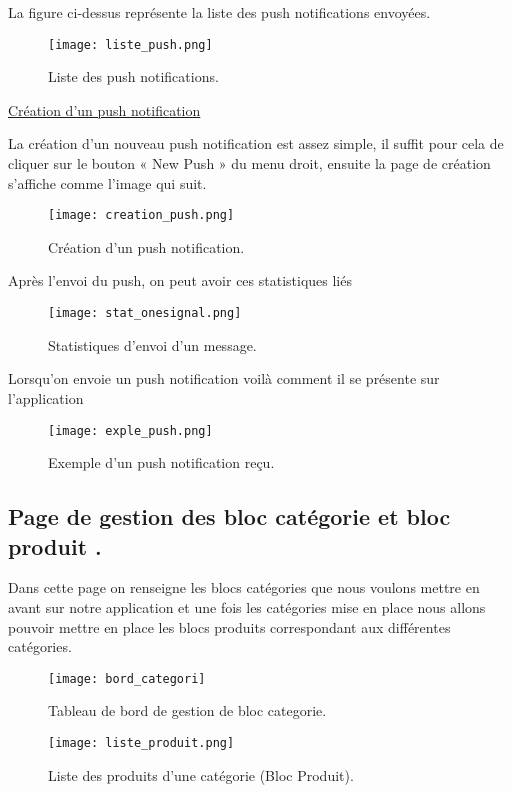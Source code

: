 La figure ci-dessus représente la liste des push notifications envoyées.

\begin{figure}[H]
	\centering
	\texttt{[image: liste\_push.png]}
	\caption{Liste des push notifications.}
	\label{fig:sp0}
\end{figure}

\underline{Création d'un push notification}

La création d’un nouveau push notification est assez simple, il suffit pour cela de cliquer sur le bouton « New Push » du menu droit, ensuite la page de création s’affiche comme l’image qui suit.

\begin{figure}[H]
	\centering
	\texttt{[image: creation\_push.png]}
	\caption{Création d'un push notification.}
	\label{fig:sp0}
\end{figure}

Après l’envoi du push, on peut avoir ces statistiques liés 
\begin{figure}[H]
	\centering
	\texttt{[image: stat\_onesignal.png]}
	\caption{Statistiques d'envoi d'un message.}
	\label{fig:sp0}
\end{figure}

Lorsqu’on envoie un push notification voilà comment il se présente sur l’application
\begin{figure}[H]
	\centering
	\texttt{[image: exple\_push.png]}
	\caption{Exemple d'un push notification reçu.}
	\label{fig:sp0}
\end{figure}

\subsection{Page de gestion des bloc catégorie et bloc produit .}

Dans cette page on renseigne les blocs catégories que nous voulons mettre en avant sur notre application et une fois les catégories mise en place nous allons pouvoir mettre en place les blocs produits correspondant aux différentes catégories.

\begin{figure}[H]
	\centering
	\texttt{[image: bord\_categori]}
	\caption{Tableau de bord de gestion de bloc categorie.}
	\label{fig:sp0}
\end{figure}

\begin{figure}[H]
	\centering
	\texttt{[image: liste\_produit.png]}
	\caption{Liste des produits d'une catégorie (Bloc Produit).}
	\label{fig:sp0}
\end{figure}

